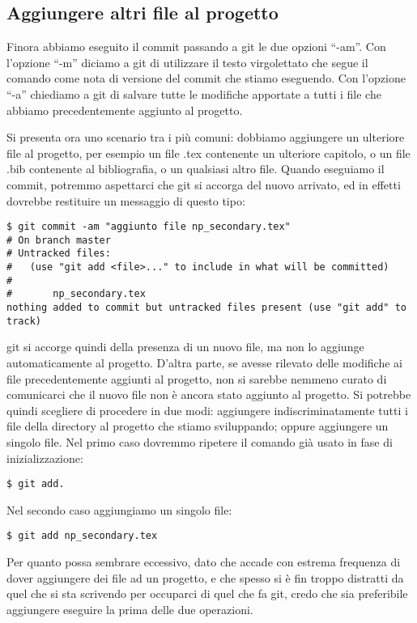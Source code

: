 \documentclass{article}
\begin{document}
\subsection{Aggiungere altri file al progetto}
Finora abbiamo eseguito il commit passando a git le due opzioni ``-am''. Con
l'opzione ``-m'' diciamo a git di utilizzare il testo virgolettato che segue il
comando come nota di versione del commit che stiamo eseguendo. Con l'opzione
``-a'' chiediamo a git di salvare tutte le modifiche apportate a tutti i file
che abbiamo precedentemente aggiunto al progetto.

Si presenta ora uno scenario tra i più comuni: dobbiamo aggiungere un ulteriore
file al progetto, per esempio un file .tex contenente un ulteriore capitolo, o
un file .bib contenente al bibliografia, o un qualsiasi altro file.
Quando eseguiamo il commit, potremmo aspettarci che git si accorga del nuovo
arrivato, ed in effetti dovrebbe restituire un messaggio di questo tipo:

\begin{lstlisting}
$ git commit -am "aggiunto file np_secondary.tex"
# On branch master
# Untracked files:
#   (use "git add <file>..." to include in what will be committed)
#
#       np_secondary.tex
nothing added to commit but untracked files present (use "git add" to track)
\end{lstlisting}

git si accorge quindi della presenza di un nuovo file, ma non lo aggiunge
automaticamente al progetto. D'altra parte, se avesse rilevato delle modifiche
ai file precedentemente aggiunti al progetto, non si sarebbe nemmeno curato di
comunicarci che il nuovo file non è ancora stato aggiunto al progetto.
Si potrebbe quindi scegliere di procedere in due modi: aggiungere
indiscriminatamente tutti i file della directory al progetto che stiamo
sviluppando; oppure aggiungere un singolo file.
Nel primo caso dovremmo ripetere il comando già usato in fase di
inizializzazione:

\begin{lstlisting}
$ git add.
\end{lstlisting}

Nel secondo caso aggiungiamo un singolo file:

\begin{lstlisting}
$ git add np_secondary.tex
\end{lstlisting}

Per quanto possa sembrare eccessivo, dato che accade con estrema frequenza di
dover aggiungere dei file ad un progetto, e che spesso si è fin troppo
distratti da quel che si sta scrivendo per occuparci di quel che fa git, credo
che sia preferibile aggiungere eseguire la prima delle due operazioni.
\end{document}
